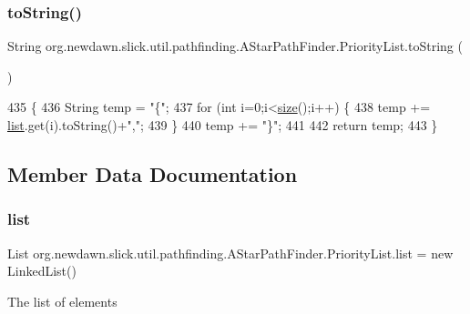\subsubsection{\texorpdfstring{to\+String()}{toString()}}
{\footnotesize\ttfamily String org.\+newdawn.\+slick.\+util.\+pathfinding.\+A\+Star\+Path\+Finder.\+Priority\+List.\+to\+String (\begin{DoxyParamCaption}{ }\end{DoxyParamCaption})\hspace{0.3cm}{\ttfamily [inline]}}


\begin{DoxyCode}
435                                  \{
436             String temp = \textcolor{stringliteral}{"\{"};
437             \textcolor{keywordflow}{for} (\textcolor{keywordtype}{int} i=0;i<\mbox{\hyperlink{classorg_1_1newdawn_1_1slick_1_1util_1_1pathfinding_1_1_a_star_path_finder_1_1_priority_list_ad086ea92d9ebfe4ecf9fea3d45cdb1e0}{size}}();i++) \{
438                 temp += \mbox{\hyperlink{classorg_1_1newdawn_1_1slick_1_1util_1_1pathfinding_1_1_a_star_path_finder_1_1_priority_list_a652f43252d1044a5a57102a8f30d2d47}{list}}.get(i).toString()+\textcolor{stringliteral}{","};
439             \}
440             temp += \textcolor{stringliteral}{"\}"};
441             
442             \textcolor{keywordflow}{return} temp;
443         \}
\end{DoxyCode}


\subsection{Member Data Documentation}
\mbox{\label{classorg_1_1newdawn_1_1slick_1_1util_1_1pathfinding_1_1_a_star_path_finder_1_1_priority_list_a652f43252d1044a5a57102a8f30d2d47}} 
\subsubsection{\texorpdfstring{list}{list}}
{\footnotesize\ttfamily List org.\+newdawn.\+slick.\+util.\+pathfinding.\+A\+Star\+Path\+Finder.\+Priority\+List.\+list = new Linked\+List()\hspace{0.3cm}{\ttfamily [private]}}

The list of elements 